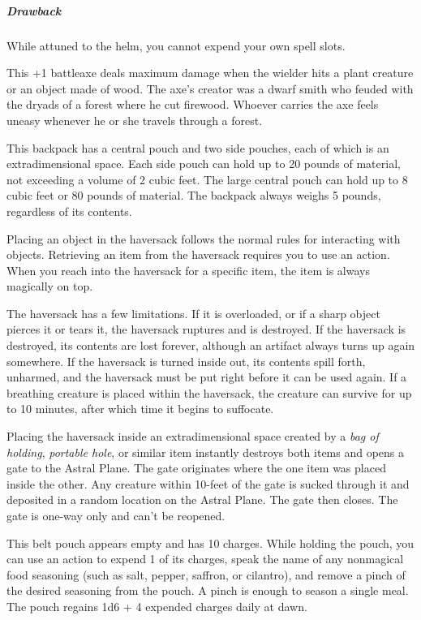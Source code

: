 \documentclass[10pt,a4paper,twoside,bg=print,twocolumn,openany,nodeprecatedcode]{dndbook}
\begin{document}
\subparagraph{Drawback}
While attuned to the helm, you cannot expend your own spell slots.

This +1 battleaxe deals maximum damage when the wielder hits a plant creature or an object made of wood. The axe's creator was a dwarf smith who feuded with the dryads of a forest where he cut firewood. Whoever carries the axe feels uneasy whenever he or she travels through a forest.

This backpack has a central pouch and two side pouches, each of which is an extradimensional space. Each side pouch can hold up to 20 pounds of material, not exceeding a volume of 2 cubic feet. The large central pouch can hold up to 8 cubic feet or 80 pounds of material. The backpack always weighs 5 pounds, regardless of its contents.

Placing an object in the haversack follows the normal rules for interacting with objects. Retrieving an item from the haversack requires you to use an action. When you reach into the haversack for a specific item, the item is always magically on top.

The haversack has a few limitations. If it is overloaded, or if a sharp object pierces it or tears it, the haversack ruptures and is destroyed. If the haversack is destroyed, its contents are lost forever, although an artifact always turns up again somewhere. If the haversack is turned inside out, its contents spill forth, unharmed, and the haversack must be put right before it can be used again. If a breathing creature is placed within the haversack, the creature can survive for up to 10 minutes, after which time it begins to suffocate.

Placing the haversack inside an extradimensional space created by a \textit{bag of holding}, \textit{portable hole}, or similar item instantly destroys both items and opens a gate to the Astral Plane. The gate originates where the one item was placed inside the other. Any creature within 10-feet of the gate is sucked through it and deposited in a random location on the Astral Plane. The gate then closes. The gate is one-way only and can't be reopened.

This belt pouch appears empty and has 10 charges. While holding the pouch, you can use an action to expend 1 of its charges, speak the name of any nonmagical food seasoning (such as salt, pepper, saffron, or cilantro), and remove a pinch of the desired seasoning from the pouch. A pinch is enough to season a single meal. The pouch regains 1d6 + 4 expended charges daily at dawn.
\end{document}
